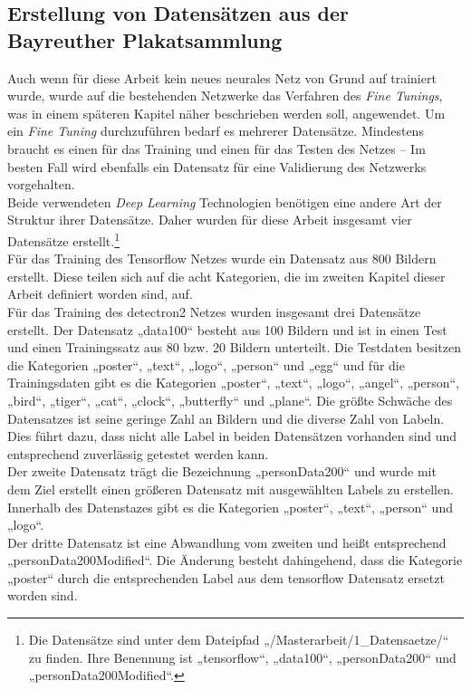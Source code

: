 \documentclass[a4paper,12pt,ngerman]{article}
\begin{document}
\subsection{Erstellung von Datensätzen aus der Bayreuther Plakatsammlung}
Auch wenn für diese Arbeit kein neues neurales Netz von Grund auf trainiert wurde, wurde auf die bestehenden Netzwerke das Verfahren des \textit{Fine Tunings}, was in einem späteren Kapitel näher beschrieben werden soll, angewendet. Um ein \textit{Fine Tuning} durchzuführen bedarf es mehrerer Datensätze. Mindestens braucht es einen für das Training und einen für das Testen des Netzes – Im besten Fall wird ebenfalls ein Datensatz für eine Validierung des Netzwerks vorgehalten. \\
Beide verwendeten \textit{Deep Learning} Technologien benötigen eine andere Art der Struktur ihrer Datensätze. Daher wurden für diese Arbeit insgesamt vier Datensätze erstellt.\footnote{Die Datensätze sind unter dem Dateipfad „/Masterarbeit/1\_Datensaetze/“ zu finden. Ihre Benennung ist „tensorflow“, „data100“, „personData200“ und „personData200Modified“.} \\
Für das Training des Tensorflow Netzes wurde ein Datensatz aus 800 Bildern erstellt. Diese teilen sich auf die acht Kategorien, die im zweiten Kapitel dieser Arbeit definiert worden sind, auf. \\
Für das Training des detectron2 Netzes wurden insgesamt drei Datensätze erstellt. Der Datensatz „data100“ besteht aus 100 Bildern und ist in einen Test und einen Trainingssatz aus 80 bzw. 20 Bildern unterteilt. Die Testdaten besitzen die Kategorien „poster“, „text“, „logo“, „person“ und „egg“ und für die Trainingsdaten gibt es die Kategorien „poster“, „text“, „logo“, „angel“, „person“, „bird“, „tiger“, „cat“, „clock“, „butterfly“ und „plane“. Die größte Schwäche des Datensatzes ist seine geringe Zahl an Bildern und die diverse Zahl von Labeln. Dies führt dazu, dass nicht alle Label in beiden Datensätzen vorhanden sind und entsprechend zuverlässig getestet werden kann. \\
Der zweite Datensatz trägt die Bezeichnung „personData200“ und wurde mit dem Ziel erstellt einen größeren Datensatz mit ausgewählten Labels zu erstellen. Innerhalb des Datenstazes gibt es die Kategorien „poster“, „text“, „person“ und „logo“. \\
Der dritte Datensatz ist eine Abwandlung vom zweiten und heißt entsprechend „personData200Modified“. Die Änderung besteht dahingehend, dass die Kategorie „poster“ durch die entsprechenden Label aus dem tensorflow Datensatz ersetzt worden sind. \\
\end{document}
